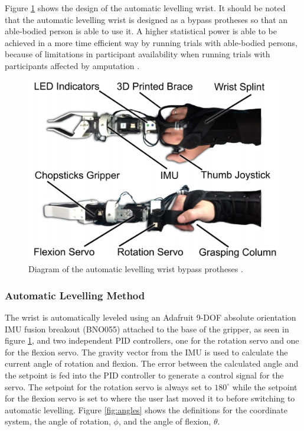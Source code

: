 \documentclass[letterpaper,12pt]{article}
\newcommand{\degrees}{^\circ}
\begin{document}
Figure \ref{fig:slw_diagram} shows the design of the automatic levelling wrist. It should be noted that the automatic levelling wrist is designed as a bypass protheses so that an able-bodied person is able to use it. A higher statistical power is able to be achieved in a more time efficient way by running trials with able-bodied persons, because of limitations in participant availability when running trials with participants affected by amputation \cite{d.j.a.brenneis}.

\begin{figure}[H]
\centering \includegraphics[width=0.8\columnwidth]{slw_diagram.png}
\caption{\label{fig:slw_diagram}Diagram of the automatic levelling wrist bypass protheses \cite{d.j.a.brenneis}.}
\end{figure}

\subsubsection{Automatic Levelling Method}
The wrist is automatically leveled using an Adafruit 9-DOF absolute orientation IMU fusion breakout (BNO055) attached to the base of the gripper, as seen in figure \ref{fig:slw_diagram}, and two independent PID controllers, one for the rotation servo and one for the flexion servo. The gravity vector from the IMU is used to calculate the current angle of rotation and flexion. The error between the calculated angle and the setpoint is fed into the PID controller to generate a control signal for the servo. The setpoint for the rotation servo is always set to $180\degrees$ while the setpoint for the flexion servo is set to where the user last moved it to before switching to automatic levelling. Figure \ref{fig:angles} shows the definitions for the coordinate system, the angle of rotation, $\phi$, and the angle of flexion, $\theta$.
\end{document}
